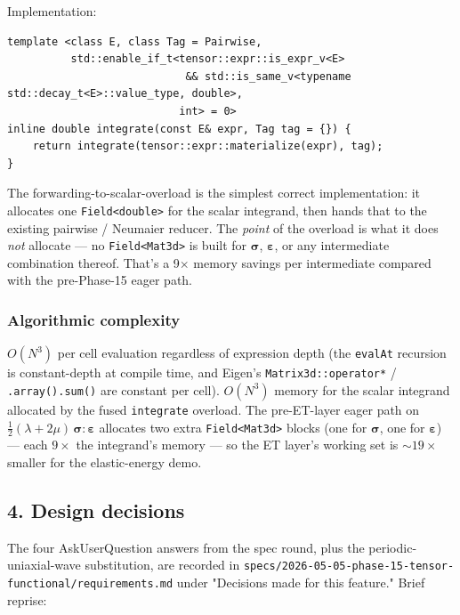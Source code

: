 Implementation:

\begin{verbatim}
template <class E, class Tag = Pairwise,
          std::enable_if_t<tensor::expr::is_expr_v<E>
                            && std::is_same_v<typename std::decay_t<E>::value_type, double>,
                           int> = 0>
inline double integrate(const E& expr, Tag tag = {}) {
    return integrate(tensor::expr::materialize(expr), tag);
}
\end{verbatim}

The forwarding-to-scalar-overload is the simplest correct
implementation: it allocates one
\passthrough{\lstinline!Field<double>!} for the scalar integrand, then
hands that to the existing pairwise / Neumaier reducer. The
\emph{point} of the overload is what it does \emph{not} allocate ---
no \passthrough{\lstinline!Field<Mat3d>!} is built for
\(\boldsymbol{\sigma}\), \(\boldsymbol{\varepsilon}\), or any
intermediate combination thereof. That's a 9\(\times\) memory savings
per intermediate compared with the pre-Phase-15 eager path.

\subsubsection{Algorithmic complexity}\label{phase15-complexity}

\(O(N^3)\) per cell evaluation regardless of expression depth (the
\passthrough{\lstinline!evalAt!} recursion is constant-depth at
compile time, and Eigen's
\passthrough{\lstinline!Matrix3d::operator*!} /
\passthrough{\lstinline!.array().sum()!} are constant per cell).
\(O(N^3)\) memory for the scalar integrand allocated by the fused
\passthrough{\lstinline!integrate!} overload. The pre-ET-layer eager
path on \(\tfrac12(\lambda + 2\mu)\,\boldsymbol{\sigma}:\boldsymbol\varepsilon\)
allocates two extra \passthrough{\lstinline!Field<Mat3d>!} blocks
(one for \(\boldsymbol{\sigma}\), one for \(\boldsymbol{\varepsilon}\)) ---
each \(9\times\) the integrand's memory --- so the ET layer's working
set is \(\sim 19\times\) smaller for the elastic-energy demo.

\subsection{4. Design decisions}\label{phase15-design}

The four AskUserQuestion answers from the spec round, plus the
periodic-uniaxial-wave substitution, are recorded in
\passthrough{\lstinline!specs/2026-05-05-phase-15-tensor-functional/requirements.md!}
under "Decisions made for this feature." Brief reprise:

